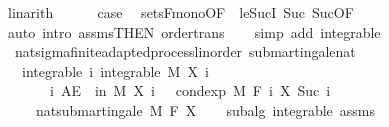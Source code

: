 \begin{isabellebody}
\ linarith\isanewline
\ \ \ \ \isamarkupfalse%
\ {\isacharquery}{\kern0pt}case\ \isamarkupfalse%
\ sets{\isacharunderscore}{\kern0pt}F{\isacharunderscore}{\kern0pt}mono{\isacharbrackleft}{\kern0pt}OF\ {\isacharunderscore}{\kern0pt}\ le{\isacharunderscore}{\kern0pt}SucI{\isacharbrackright}{\kern0pt}\ Suc{\isacharparenleft}{\kern0pt}{}{\isacharparenright}{\kern0pt}\ Suc{\isacharparenleft}{\kern0pt}{}{\isacharparenright}{\kern0pt}{\isacharbrackleft}{\kern0pt}OF\ {\isacharasterisk}{\kern0pt}{\isacharbrackright}{\kern0pt}\ \isamarkupfalse%
\ {\isacharparenleft}{\kern0pt}auto\ intro{\isacharcolon}{\kern0pt}\ assms{\isacharparenleft}{\kern0pt}{}{\isacharparenright}{\kern0pt}{\isacharbrackleft}{\kern0pt}THEN\ order{\isacharunderscore}{\kern0pt}trans{\isacharbrackright}{\kern0pt}{\isacharparenright}{\kern0pt}\isanewline
\ \ \isamarkupfalse%
\isanewline
{}\isamarkupfalse%
\ {\isacharparenleft}{\kern0pt}simp\ add{\isacharcolon}{\kern0pt}\ integrable{\isacharparenright}{\kern0pt}%
\endisatagproof
{\isafoldproof}%
%
\isadelimproof
\isanewline
%
\endisadelimproof
\isanewline
{}\isamarkupfalse%
\ {\isacharparenleft}{\kern0pt}\ nat{\isacharunderscore}{\kern0pt}sigma{\isacharunderscore}{\kern0pt}finite{\isacharunderscore}{\kern0pt}adapted{\isacharunderscore}{\kern0pt}process{\isacharunderscore}{\kern0pt}linorder{\isacharparenright}{\kern0pt}\ submartingale{\isacharunderscore}{\kern0pt}nat{\isacharcolon}{\kern0pt}\isanewline
\ \ \ integrable{\isacharcolon}{\kern0pt}\ {\isachardoublequoteopen}{\isasymAnd}i{\isachardot}{\kern0pt}\ integrable\ M\ {\isacharparenleft}{\kern0pt}X\ i{\isacharparenright}{\kern0pt}{\isachardoublequoteclose}\ \isanewline
\ \ \ \ \ \ \ {\isachardoublequoteopen}{\isasymAnd}i{\isachardot}{\kern0pt}\ AE\ {\isasymxi}\ in\ M{\isachardot}{\kern0pt}\ X\ i\ {\isasymxi}\ {\isasymle}\ cond{\isacharunderscore}{\kern0pt}exp\ M\ {\isacharparenleft}{\kern0pt}F\ i{\isacharparenright}{\kern0pt}\ {\isacharparenleft}{\kern0pt}X\ {\isacharparenleft}{\kern0pt}Suc\ i{\isacharparenright}{\kern0pt}{\isacharparenright}{\kern0pt}\ {\isasymxi}{\isachardoublequoteclose}\ \isanewline
\ \ \ \ \ {\isachardoublequoteopen}nat{\isacharunderscore}{\kern0pt}submartingale\ M\ F\ X{\isachardoublequoteclose}\isanewline
%
\isadelimproof
\ \ %
\endisadelimproof
%
\isatagproof
{}\isamarkupfalse%
\ subalg\ integrable\ assms{\isacharparenleft}{\kern0pt}{}{\isacharparenright}{\kern0pt}\isanewline

\end{isabellebody}
